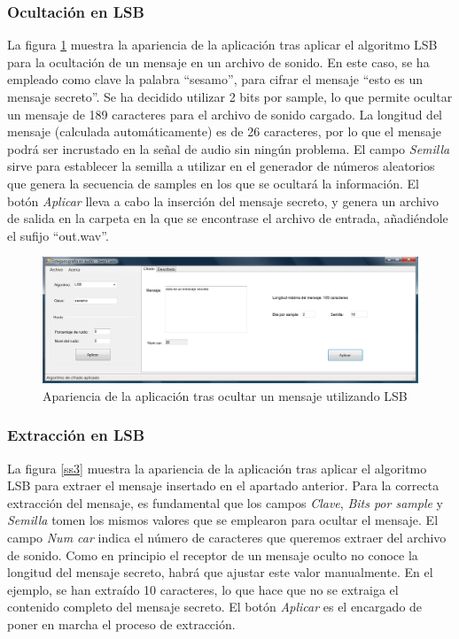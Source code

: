 \documentclass[12pt]{article}
\begin{document}
\subsubsection{Ocultación en LSB}

La figura \ref{ss2} muestra la apariencia de la aplicación tras aplicar el algoritmo LSB para la ocultación de un mensaje en un archivo de sonido. En este caso, se ha empleado como clave la palabra ``sesamo'', para cifrar el mensaje  ``esto es un mensaje secreto''. Se ha decidido utilizar 2 bits por sample, lo que permite ocultar un mensaje de 189 caracteres para el archivo de sonido cargado. La longitud del mensaje (calculada automáticamente) es de 26 caracteres, por lo que el mensaje podrá ser incrustado en la señal de audio sin ningún problema. El campo \emph{Semilla} sirve para establecer la semilla a utilizar en el generador de números aleatorios que genera la secuencia de samples en los que se ocultará la información. El botón \emph{Aplicar} lleva a cabo la inserción del mensaje secreto, y genera un archivo de salida en la carpeta en la que se encontrase el archivo de entrada, añadiéndole el sufijo ``out.wav''.

\begin{figure}[h]
  \centering
    \includegraphics[width=\textwidth]{img/ss2}
  \caption{Apariencia de la aplicación tras ocultar un mensaje utilizando LSB}
  \label{ss2}
\end{figure}

\subsubsection{Extracción en LSB}

La figura \ref{ss3} muestra la apariencia de la aplicación tras aplicar el algoritmo LSB para extraer el mensaje insertado en el apartado anterior. Para la correcta extracción del mensaje, es fundamental que los campos \emph{Clave}, \emph{Bits por sample} y \emph{Semilla} tomen los mismos valores que se emplearon para ocultar el mensaje. El campo \emph{Num car} indica el número de caracteres que queremos extraer del archivo de sonido. Como en principio el receptor de un mensaje oculto no conoce la longitud del mensaje secreto, habrá que ajustar este valor manualmente. En el ejemplo, se han extraído 10 caracteres, lo que hace que no se extraiga el contenido completo del mensaje secreto. El botón \emph{Aplicar} es el encargado de poner en marcha el proceso de extracción.
\end{document}
